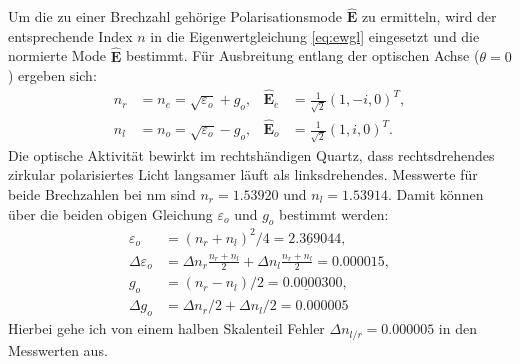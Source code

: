 \documentclass[twocolumn,10pt,DIV18]{scrartcl}
\renewcommand{\v}[1]{{\mathbf #1}} %
\newcommand{\E}{\v E}
\newcommand{\eps}{\varepsilon}
\renewcommand{\[}{\left[}
\renewcommand{\]}{\right]}
\renewcommand{\(}{\left(}
\renewcommand{\)}{\right)}
\begin{document}
  Um die zu einer Brechzahl geh\"orige Polarisationsmode $\hat\E$ zu
  ermitteln, wird der entsprechende Index $n$ in die
  Eigenwertgleichung \eqref{eq:ewgl} eingesetzt und die normierte Mode
  $\hat\E$ bestimmt.  F\"ur Ausbreitung entlang der optischen Achse
  ($\theta=0$) ergeben sich:
  \begin{align} %
    n_r&=n_e=\sqrt{\eps_o}+g_o, &\hat\E_e&=\frac{1}{\sqrt{2}}(1,-i,0)^T,\\
    n_l&=n_o=\sqrt{\eps_o}-g_o, &\hat\E_o&=\frac{1}{\sqrt{2}}(1,i,0)^T.
  \end{align}
  Die optische Aktivit\"at bewirkt im rechtsh\"andigen Quartz, dass
  rechtsdrehendes zirkular polarisiertes Licht langsamer l\"auft als
  linksdrehendes.  Messwerte f\"ur beide Brechzahlen bei
  \unit[762]{nm} sind $n_r=1.53920$ und $n_l=1.53914$. Damit k\"onnen
  \"uber die beiden obigen Gleichung $\eps_o$ und $g_o$ bestimmt
  werden:
  \begin{align}
    \eps_o&=(n_r+n_l)^2/4=\underbar{2.36904}4,\\
    \Delta\eps_o&=\Delta n_r \frac{n_r+n_l}{2}+\Delta n_l \frac{n_r+n_l}{2}=0.000015,\\
    g_o&=(n_r-n_l)/2=\underbar{0.000030}0,\\
    \Delta g_o &= \Delta n_r/2 + \Delta n_l/2 = 0.000005
  \end{align}
  Hierbei gehe ich von einem halben Skalenteil Fehler $\Delta
  n_{l/r}=0.000005$ in den Messwerten aus.
\end{document}
